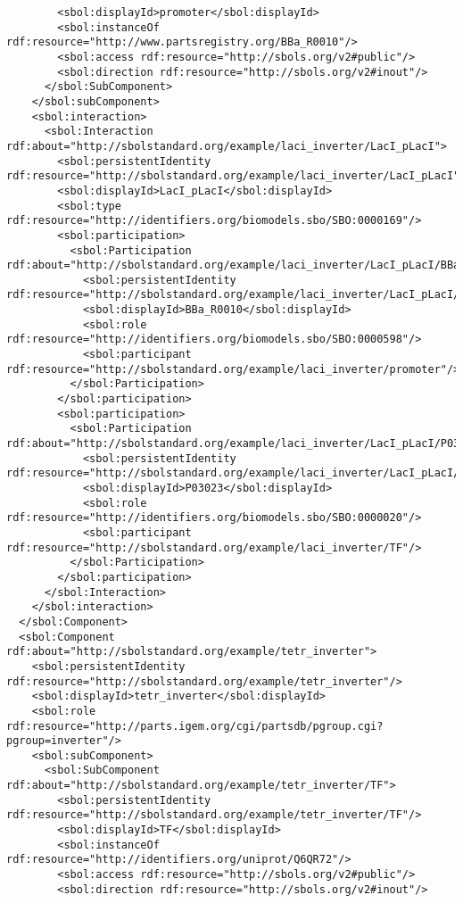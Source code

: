 \begin{lstlisting}
        <sbol:displayId>promoter</sbol:displayId>
        <sbol:instanceOf rdf:resource="http://www.partsregistry.org/BBa_R0010"/>
        <sbol:access rdf:resource="http://sbols.org/v2#public"/>
        <sbol:direction rdf:resource="http://sbols.org/v2#inout"/>
      </sbol:SubComponent>
    </sbol:subComponent>
    <sbol:interaction>
      <sbol:Interaction rdf:about="http://sbolstandard.org/example/laci_inverter/LacI_pLacI">
        <sbol:persistentIdentity rdf:resource="http://sbolstandard.org/example/laci_inverter/LacI_pLacI"/>
        <sbol:displayId>LacI_pLacI</sbol:displayId>
        <sbol:type rdf:resource="http://identifiers.org/biomodels.sbo/SBO:0000169"/>
        <sbol:participation>
          <sbol:Participation rdf:about="http://sbolstandard.org/example/laci_inverter/LacI_pLacI/BBa_R0010">
            <sbol:persistentIdentity rdf:resource="http://sbolstandard.org/example/laci_inverter/LacI_pLacI/BBa_R0010"/>
            <sbol:displayId>BBa_R0010</sbol:displayId>
            <sbol:role rdf:resource="http://identifiers.org/biomodels.sbo/SBO:0000598"/>
            <sbol:participant rdf:resource="http://sbolstandard.org/example/laci_inverter/promoter"/>
          </sbol:Participation>
        </sbol:participation>
        <sbol:participation>
          <sbol:Participation rdf:about="http://sbolstandard.org/example/laci_inverter/LacI_pLacI/P03023">
            <sbol:persistentIdentity rdf:resource="http://sbolstandard.org/example/laci_inverter/LacI_pLacI/P03023"/>
            <sbol:displayId>P03023</sbol:displayId>
            <sbol:role rdf:resource="http://identifiers.org/biomodels.sbo/SBO:0000020"/>
            <sbol:participant rdf:resource="http://sbolstandard.org/example/laci_inverter/TF"/>
          </sbol:Participation>
        </sbol:participation>
      </sbol:Interaction>
    </sbol:interaction>
  </sbol:Component>
  <sbol:Component rdf:about="http://sbolstandard.org/example/tetr_inverter">
    <sbol:persistentIdentity rdf:resource="http://sbolstandard.org/example/tetr_inverter"/>
    <sbol:displayId>tetr_inverter</sbol:displayId>
    <sbol:role rdf:resource="http://parts.igem.org/cgi/partsdb/pgroup.cgi?pgroup=inverter"/>
    <sbol:subComponent>
      <sbol:SubComponent rdf:about="http://sbolstandard.org/example/tetr_inverter/TF">
        <sbol:persistentIdentity rdf:resource="http://sbolstandard.org/example/tetr_inverter/TF"/>
        <sbol:displayId>TF</sbol:displayId>
        <sbol:instanceOf rdf:resource="http://identifiers.org/uniprot/Q6QR72"/>
        <sbol:access rdf:resource="http://sbols.org/v2#public"/>
        <sbol:direction rdf:resource="http://sbols.org/v2#inout"/>

\end{lstlisting}
